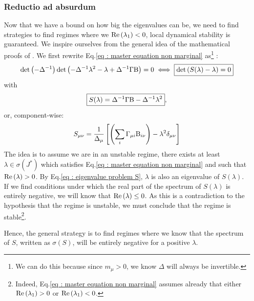 \documentclass[12pt, titlepage]{report}
\begin{document}
\subsubsection{Reductio ad absurdum} \label{subsubsec : reductio ad absurdum}
Now that we have a bound on how big the eigenvalues can be, we need to find strategies to find regimes where we  $\text{Re}\left(\lambda_1\right) < 0 $, \ie local dynamical stability is guaranteed. We inspire ourselves from the general idea of the mathematical proofs of \cite{butler_stability_2018}.
We first rewrite Eq.\eqref{eq : master equation non marginal} as\footnote{We can do this because since $m_\mu > 0$, we know $\Delta$ will always be invertible.} :
\begin{equation}
\det\left(-\Delta^{-1}\right)\det\left(-\Delta^{-1}\lambda^2-\lambda+\Delta^{-1}\Gamma\text{B}\right)=0\iff \boxed{\det\left(S(\lambda)-\lambda\right)=0} \label{eq : eigenvalue problem S}
\end{equation}
with
\begin{equation}
\boxed{S(\lambda)=\Delta^{-1}\Gamma\text{B}-\Delta^{-1}\lambda^2}, \label{eq : equation stability S}
\end{equation}
or, component-wise:
\begin{equation}
S_{\mu \nu} = \frac{1}{\Delta_\mu}\left[\left(\sum_i \Gamma_{\mu i}\text{B}_{i \nu}\right) - \lambda^2 \delta_{\mu\nu}\right] \label{eq : definition S component wise}
\end{equation}
The idea is to assume we are in an unstable regime, there exists at least $\lambda \in \sigma(J^*)$ which satisfies Eq.\eqref{eq : master equation non marginal} and such that $\text{Re}\left(\lambda\right) > 0$. By Eq.\eqref{eq : eigenvalue problem S}, $\lambda$ is also an eigenvalue of $S(\lambda)$. If we find conditions under which the real part of the spectrum of $S(\lambda)$ is entirely negative, we will know that $\text{Re}\left(\lambda\right) \leq 0$. As this is a contradiction to the hypothesis that the regime is unstable, we must conclude that the regime is stable\footnote{Indeed, Eq.\eqref{eq : master equation non marginal} assumes already that either $\text{Re}\left(\lambda_1\right) >0$ or $\text{Re}\left(\lambda_1\right) < 0$.}.

Hence, the general strategy is to find regimes where we know that the spectrum of $S$, written as $\sigma(S)$, will be entirely negative for a positive $\lambda$.
\end{document}

